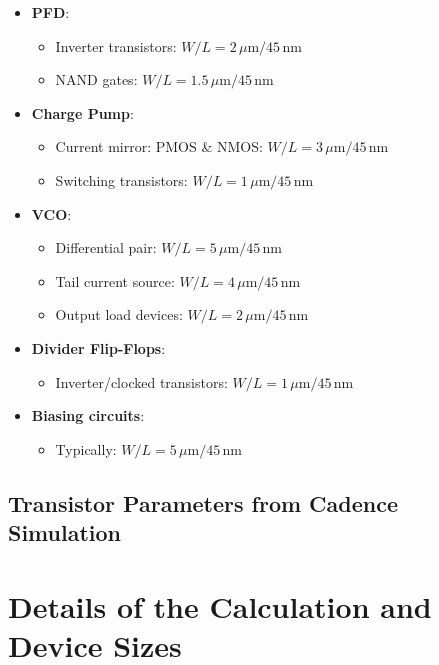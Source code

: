 \begin{itemize}
    \item \textbf{PFD}:
    \begin{itemize}
        \item Inverter transistors: $W/L = 2\,\mu\text{m} / 45\,\text{nm}$
        \item NAND gates: $W/L = 1.5\,\mu\text{m} / 45\,\text{nm}$
    \end{itemize}

    \item \textbf{Charge Pump}:
    \begin{itemize}
        \item Current mirror: PMOS \& NMOS: $W/L = 3\,\mu\text{m} / 45\,\text{nm}$
        \item Switching transistors: $W/L = 1\,\mu\text{m} / 45\,\text{nm}$
    \end{itemize}

    \item \textbf{VCO}:
    \begin{itemize}
        \item Differential pair: $W/L = 5\,\mu\text{m} / 45\,\text{nm}$
        \item Tail current source: $W/L = 4\,\mu\text{m} / 45\,\text{nm}$
        \item Output load devices: $W/L = 2\,\mu\text{m} / 45\,\text{nm}$
    \end{itemize}

    \item \textbf{Divider Flip-Flops}:
    \begin{itemize}
        \item Inverter/clocked transistors: $W/L = 1\,\mu\text{m} / 45\,\text{nm}$
    \end{itemize}

    \item \textbf{Biasing circuits}:
    \begin{itemize}
        \item Typically: $W/L = 5\,\mu\text{m} / 45\,\text{nm}$
    \end{itemize}
\end{itemize}

\subsection{Transistor Parameters from Cadence Simulation}

\section{Details of the Calculation and Device Sizes}



